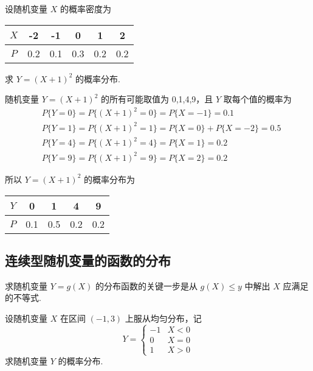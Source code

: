\begin{problem}
    设随机变量 $X$ 的概率密度为

    \begin{table}[htbp]
        \centering

        \begin{tabular}{c | c c c c c}
            \hline
            $X$ & -2 & -1 & 0 & 1 & 2 \\
            \hline
            $P$ & 0.2 & 0.1 & 0.3 & 0.2 & 0.2 \\
            \hline
        \end{tabular}
    \end{table}
    求 $Y=(X+1)^2$ 的概率分布.
\end{problem}

\begin{solution}
    随机变量 $Y=(X+1)^2$ 的所有可能取值为 0,1,4,9，且 $Y$ 取每个值的概率为
    \begin{align*}
        & P\{Y=0\} = P\{(X+1)^2 = 0\} = P\{X=-1\} = 0.1\\
        & P\{Y=1\} = P\{(X+1)^2 = 1\} = P\{X=0\} + P\{X=-2\} = 0.5\\
        & P\{Y=4\} = P\{(X+1)^2 = 4\} = P\{X=1\} = 0.2\\
        & P\{Y=9\} = P\{(X+1)^2 = 9\} = P\{X=2\} = 0.2
    \end{align*}
    
    所以 $Y=(X+1)^2$ 的概率分布为\newline
    
    \centering
    \begin{tabular}{c | c c c c}
        \hline
        $Y$ & 0 & 1 & 4 & 9 \\
        \hline
        $P$ & 0.1 & 0.5 & 0.2 & 0.2 \\
        \hline
    \end{tabular}
\end{solution}

\subsection{连续型随机变量的函数的分布}

求随机变量 $Y=g(X)$ 的分布函数的关键一步是从 $g(X) \leqslant y$ 中解出 $X$ 应满足的不等式.

\begin{problem}
    设随机变量 $X$ 在区间 $(-1,3)$ 上服从均匀分布，记
    $$
    Y=\begin{cases}
        -1 & X<0 \\
        0 & X=0 \\
        1 & X>0
    \end{cases}
    $$
    求随机变量 $Y$ 的概率分布.
\end{problem}

